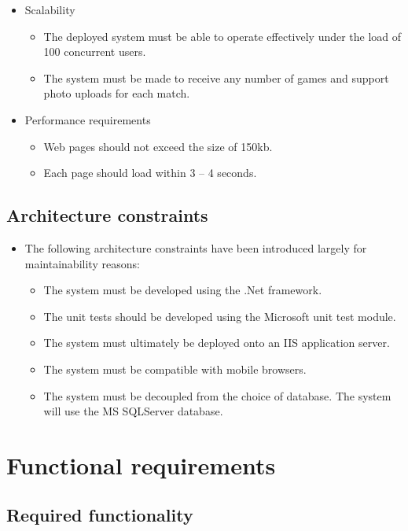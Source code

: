 \documentclass[11pt]{article}
\begin{document}
\begin{itemize}
\item Scalability
	\begin{itemize}
	\item The deployed system must be able to operate effectively under the load of 100 concurrent users.
	\item The system must be made to receive any number of games and support photo uploads for each match.
	\end{itemize}
\end{itemize}
\begin{itemize}
\item Performance requirements
	\begin{itemize}
	\item Web pages should not exceed the size of 150kb.
	\item Each page should load within 3 – 4 seconds.
	\end{itemize}
\end{itemize}
\subsection{Architecture constraints}
	\begin{itemize}
		\item The following architecture constraints have been introduced largely for maintainability reasons:
			\begin{itemize}
				\item The system must be developed using the .Net framework.
				\item The unit tests should be developed using the Microsoft unit test module.
				\item The system must ultimately be deployed onto an IIS application server.
				\item The system must be compatible with mobile browsers.
				\item The system must be decoupled from the choice of database. The system will use the MS SQLServer database.
			\end{itemize}
	\end{itemize}
\section{Functional requirements}
\subsection{Required functionality}
\end{document}
